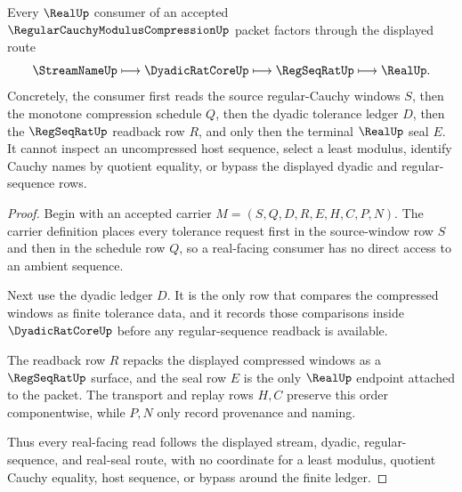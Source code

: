 \begin{theorem}
\label{thm:regular-cauchy-modulus-compression-real-seal-route}
Every $\RealUp$ consumer of an accepted $\RegularCauchyModulusCompressionUp$ packet factors through the displayed route
$$
\StreamNameUp \longmapsto \DyadicRatCoreUp \longmapsto \RegSeqRatUp \longmapsto \RealUp .
$$
Concretely, the consumer first reads the source regular-Cauchy windows $S$, then the monotone compression schedule $Q$, then the dyadic tolerance ledger $D$, then the $\RegSeqRatUp$ readback row $R$, and only then the terminal $\RealUp$ seal $E$. It cannot inspect an uncompressed host sequence, select a least modulus, identify Cauchy names by quotient equality, or bypass the displayed dyadic and regular-sequence rows.
\end{theorem}
\begin{proof}
Begin with an accepted carrier $M=(S,Q,D,R,E,H,C,P,N)$. The carrier definition places every tolerance request first in the source-window row $S$ and then in the schedule row $Q$, so a real-facing consumer has no direct access to an ambient sequence.

Next use the dyadic ledger $D$. It is the only row that compares the compressed windows as finite tolerance data, and it records those comparisons inside $\DyadicRatCoreUp$ before any regular-sequence readback is available.

The readback row $R$ repacks the displayed compressed windows as a $\RegSeqRatUp$ surface, and the seal row $E$ is the only $\RealUp$ endpoint attached to the packet. The transport and replay rows $H,C$ preserve this order componentwise, while $P,N$ only record provenance and naming.

Thus every real-facing read follows the displayed stream, dyadic, regular-sequence, and real-seal route, with no coordinate for a least modulus, quotient Cauchy equality, host sequence, or bypass around the finite ledger.
\end{proof}


